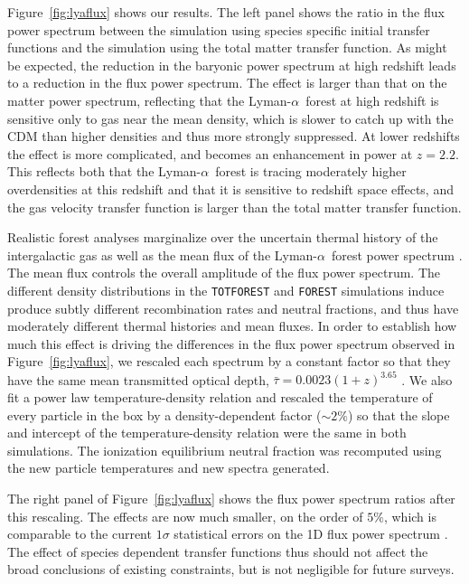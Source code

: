 \documentclass[a4paper,11pt]{article}
\newcommand{\Lya}{Lyman-$\alpha$}
\begin{document}
Figure~\ref{fig:lyaflux} shows our results. The left panel shows the ratio in the flux power spectrum between the simulation using species specific initial transfer functions and the simulation using the total matter transfer function. As might be expected, the reduction in the baryonic power spectrum at high redshift leads to a reduction in the flux power spectrum. The effect is larger than that on the matter power spectrum, reflecting that the \Lya~forest at high redshift is sensitive only to gas near the mean density, which is slower to catch up with the CDM than higher densities and thus more strongly suppressed. At lower redshifts the effect is more complicated, and becomes an enhancement in power at $z=2.2$. This reflects both that the \Lya~forest is tracing moderately higher overdensities at this redshift and that it is sensitive to redshift space effects, and the gas velocity transfer function is larger than the total matter transfer function.

Realistic forest analyses marginalize over the uncertain thermal history of the intergalactic gas as well as the mean flux of the \Lya~forest power spectrum \citep[e.g.][]{PD2013}. The mean flux controls the overall amplitude of the flux power spectrum. The different density distributions in the \texttt{TOTFOREST} and \texttt{FOREST} simulations induce produce subtly different recombination rates and neutral fractions, and thus have moderately different thermal histories and mean fluxes. In order to establish how much this effect is driving the differences in the flux power spectrum observed in Figure~\ref{fig:lyaflux}, we rescaled each spectrum by a constant factor so that they have the same mean transmitted optical depth, $\bar{\tau} = 0.0023 (1 + z)^{3.65}$ \cite{Kim:2007}. We also fit a power law temperature-density relation and rescaled the temperature of every particle in the box by a density-dependent factor ($\sim 2\%$) so that the slope and intercept of the temperature-density relation were the same in both simulations. The ionization equilibrium neutral fraction was recomputed using the new particle temperatures and new spectra generated.

The right panel of Figure~\ref{fig:lyaflux} shows the flux power spectrum ratios after this rescaling. The effects are now much smaller, on the order of $5\%$, which is comparable to the current $1\sigma$ statistical errors on the 1D flux power spectrum \cite{PD2013}. The effect of species dependent transfer functions thus should not affect the broad conclusions of existing constraints, but is not negligible for future surveys.
\end{document}
